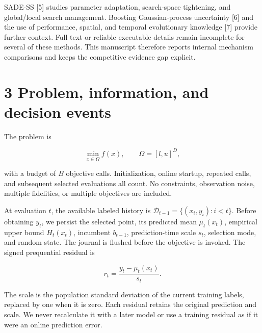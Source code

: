 \documentclass[11pt,a4paper]{article}
\begin{document}
SADE-SS {[}5{]} studies parameter adaptation, search-space tightening,
and global/local search management. Boosting Gaussian-process
uncertainty {[}6{]} and the use of performance, spatial, and temporal
evolutionary knowledge {[}7{]} provide further context. Full text or
reliable executable details remain incomplete for several of these
methods. This manuscript therefore reports internal mechanism
comparisons and keeps the competitive evidence gap explicit.

\par{}\noindent\begin{minipage}{\linewidth}

\hypertarget{problem-information-and-decision-events}{%
\section{3 Problem, information, and decision
events}\label{problem-information-and-decision-events}}

The problem is

\[\min_{x\in\Omega}f(x),\qquad\Omega=[l,u]^D,\]

\end{minipage}\par

with a budget of \(B\) objective calls. Initialization, online startup,
repeated calls, and subsequent selected evaluations all count. No
constraints, observation noise, multiple fidelities, or multiple
objectives are included.

\par\noindent\begin{minipage}{\linewidth}

At evaluation \(t\), the available labeled history is
\(\mathcal D_{t-1}=\{(x_i,y_i):i<t\}\). Before obtaining \(y_t\), we
persist the selected point, its predicted mean \(\mu_t(x_t)\), empirical
upper bound \(H_t(x_t)\), incumbent \(b_{t-1}\), prediction-time scale
\(s_t\), selection mode, and random state. The journal is flushed before
the objective is invoked. The signed prequential residual is

\[r_t=\frac{y_t-\mu_t(x_t)}{s_t}.\]

\end{minipage}\par

The scale is the population standard deviation of the current training
labels, replaced by one when it is zero. Each residual retains the
original prediction and scale. We never recalculate it with a later
model or use a training residual as if it were an online prediction
error.
\end{document}
